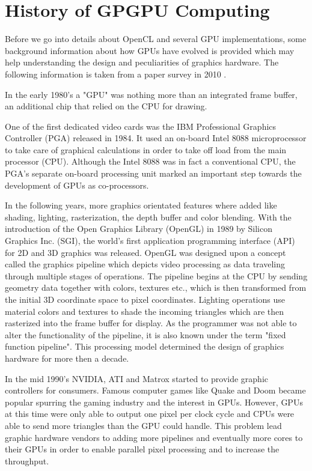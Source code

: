 \section{History of GPGPU Computing} 
\label{sec:history}
Before we go into details about OpenCL and several GPU implementations, some background information about how GPUs have evolved is provided which may help understanding the design and peculiarities of graphics hardware. The following information is taken from a paper survey in 2010 \cite{gpu_history}.

In the early 1980's a "GPU" was nothing more than an integrated frame buffer, an additional chip that relied on the CPU for drawing.

One of the first dedicated video cards was the IBM Professional Graphics Controller (PGA) released in 1984. It used an on-board Intel 8088 microprocessor to take care of graphical calculations in order to take off load from the main processor (CPU). Although the Intel 8088 was in fact a conventional CPU, the PGA's separate on-board processing unit marked an important step towards the development of GPUs as co-processors.

In the following years, more graphics orientated features where added like shading, lighting, rasterization, the depth buffer and color blending. With the introduction of the Open Graphics Library (OpenGL) in 1989 by Silicon Graphics Inc. (SGI), the world's first application programming interface (API) for 2D and 3D graphics was released. OpenGL was designed upon a concept called the graphics pipeline which depicts video processing as data traveling through multiple stages of operations. The pipeline begins at the CPU by sending geometry data together with colors, textures etc., which is then transformed from the initial 3D coordinate space to pixel coordinates. Lighting operations use material colors and textures to shade the incoming triangles which are then rasterized into the frame buffer for display. As the programmer was not able to alter the functionality of the pipeline, it is also known under the term "fixed function pipeline". This processing model determined the design of graphics hardware for more then a decade.

In the mid 1990's NVIDIA, ATI and Matrox started to provide graphic controllers for consumers. Famous computer games like Quake and Doom became popular spurring the gaming industry and the interest in GPUs. However, GPUs at this time were only able to output one pixel per clock cycle and CPUs were able to send more triangles than the GPU could handle. This problem lead graphic hardware vendors to adding more pipelines and eventually more cores to their GPUs in order to enable parallel pixel processing and to increase the throughput.

